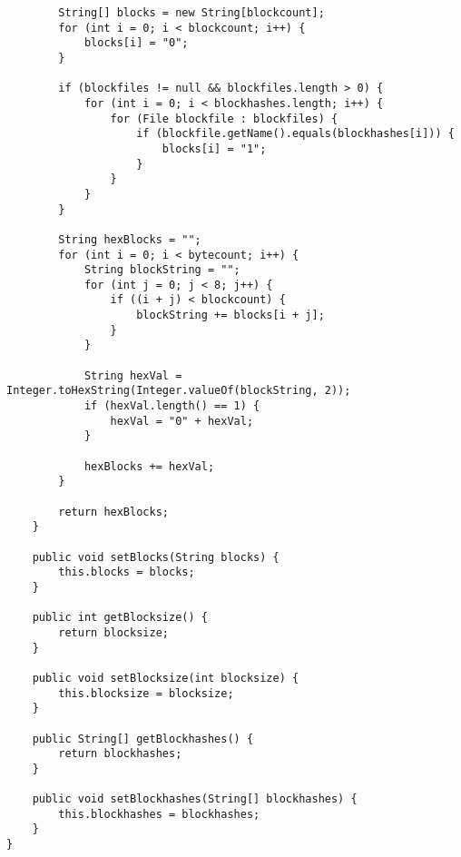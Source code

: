 \documentclass{acm_proc_article-sp}
\begin{document}
\begin{lstlisting}
        String[] blocks = new String[blockcount];
        for (int i = 0; i < blockcount; i++) {
            blocks[i] = "0";
        }

        if (blockfiles != null && blockfiles.length > 0) {
            for (int i = 0; i < blockhashes.length; i++) {
                for (File blockfile : blockfiles) {
                    if (blockfile.getName().equals(blockhashes[i])) {
                        blocks[i] = "1";
                    }
                }
            }
        }

        String hexBlocks = "";
        for (int i = 0; i < bytecount; i++) {
            String blockString = "";
            for (int j = 0; j < 8; j++) {
                if ((i + j) < blockcount) {
                    blockString += blocks[i + j];
                }
            }

            String hexVal = Integer.toHexString(Integer.valueOf(blockString, 2));
            if (hexVal.length() == 1) {
                hexVal = "0" + hexVal;
            }

            hexBlocks += hexVal;
        }

        return hexBlocks;
    }

    public void setBlocks(String blocks) {
        this.blocks = blocks;
    }

    public int getBlocksize() {
        return blocksize;
    }

    public void setBlocksize(int blocksize) {
        this.blocksize = blocksize;
    }

    public String[] getBlockhashes() {
        return blockhashes;
    }

    public void setBlockhashes(String[] blockhashes) {
        this.blockhashes = blockhashes;
    }
}
\end{lstlisting}
\end{document}
